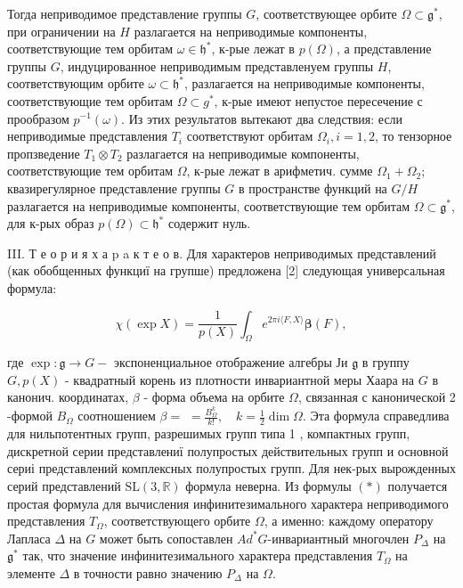 \documentclass[10pt]{article}
\begin{document}
Тогда неприводимое представление группы $G$, соответствующее орбите $\Omega \subset \mathfrak{g}^{*}$, при ограничении на $H$ разлагается на неприводимые компоненты, соответствующие тем орбитам $\omega \in \mathfrak{h}^{*}$, к-рые лежат в $p(\Omega)$, а представление группы $G$, индуцированное неприводимым представленуем группы $H$, соответствующим орбите $\omega \subset \mathfrak{h}^{*}$, разлагается на неприводимые компоненты, соответствующие тем орбитам $\Omega \subset g^{*}$, к-рые имеют непустое пересечение с прообразом $p^{-1}(\omega)$. Из этих результатов вытекают два следствия: если неприводимые представления $T_{i}$ соответствуют орбитам $\Omega_{i}, i=1,2$, то тензорное пропзведение $T_{1} \otimes T_{2}$ разлагается на неприводимые компоненты, соответствующие тем орбитам $\Omega$, к-рые лежат в арифметич. сумме $\Omega_{1}+\Omega_{2}$; квазирегулярное представление группы $G$ в пространстве функций на $G / H$ разлагается на неприводимые компоненты, соответствующие тем орбитам $\Omega \subset \mathfrak{g}^{*}$, для к-рых образ $p(\Omega) \subset \mathfrak{h}^{*}$ содержит нуль.



III. Т е о р и я х а p a к т е о в. Для характеров неприводимых представлений (как обобщенных функциї на групше) предложена [2] следующая универсальная формула:



\[

\chi(\exp X)=\frac{1}{p(X)} \int_{\Omega} e^{2 \pi i\langle F, X\rangle} \boldsymbol{\beta}(F),

\]



где $\exp : \mathfrak{g} \rightarrow G-$ экспоненциальное отображение алгебры Ји $\mathfrak{g}$ в группу $G, p(X)$ - квадратный корень из плотности инвариантной меры Хаара на $G$ в канонич. координатах, $\beta$ - форма объема на орбите $\Omega$, связанная с канонической 2 -формой $B_{\Omega}$ соотношением $\beta=$ $=\frac{B_{\Omega}^{k}}{k !}, \quad k=\frac{1}{2} \operatorname{dim} \Omega$. Эта формула справедлива для нильпотентных групп, разрешимых групп типа 1 , компактных групп, дискретной серии представлениї полупростых действительных групп и основной сериі представлений комплексных полупростых групп. Для нек-рых вырожденных серий представлений $\mathrm{SL}(3, \mathbb{R})$ формула неверна. Из формулы $(*)$ получается простая формула для вычисления инфинитезимального характера неприводимого представления $T_{\Omega}$, соответствующего орбите $\Omega$, а именно: каждому оператору Лапласа $\Delta$ на $G$ может быть сопоставлен $A d^{*} G$-инвариантный многочлен $P_{\Delta}$ на $\mathfrak{g}^{*}$ так, что значение инфинитезимального характера представления $T_{\Omega}$ на элементе $\Delta$ в точности равно значению $P_{\Delta}$ на $\Omega$.
\end{document}
